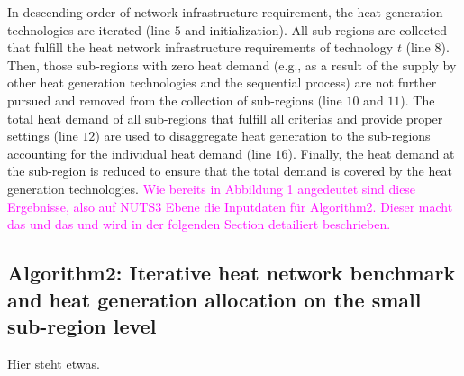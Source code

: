 In descending order of network infrastructure requirement, the heat generation technologies are iterated (line $5$ and initialization). All sub-regions are collected that fulfill the heat network infrastructure requirements of technology $t$ (line $8$). Then, those sub-regions with zero heat demand (e.g., as a result of the supply by other heat generation technologies and the sequential process) are not further pursued and removed from the collection of sub-regions (line $10$ and $11$). The total heat demand of all sub-regions that fulfill all criterias and provide proper settings (line $12$) are used to disaggregate heat generation to the sub-regions accounting for the individual heat demand (line $16$). Finally, the heat demand at the sub-region is reduced to ensure that the total demand is covered by the heat generation technologies. \textcolor{magenta}{Wie bereits in Abbildung 1 angedeutet sind diese Ergebnisse, also auf NUTS3 Ebene die Inputdaten für Algorithm2. Dieser macht das und das und wird in der folgenden Section detailiert beschrieben.}

\subsection{Algorithm2: Iterative heat network benchmark and heat generation allocation on the small sub-region level}
Hier steht etwas.


